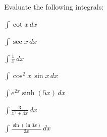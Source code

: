 \documentclass[12pt]{exam}
\begin{document}
\begin{questions}
Evaluate the following integrals:
\vspace{.1in}

\question $\displaystyle \int \cot x \, dx$
\vspace{.1in}

\question  $\displaystyle \int \sec x \, dx$
\vspace{.1in}

\question $\displaystyle \int \frac{1}{x}  \, dx$
\vspace{.1in}

\question $\displaystyle \int  \cos^2 x \, \sin x \, dx$
\vspace{.1in}

\question $\displaystyle \int e^{2x} \sinh(5x)\, dx$
\vspace{.1in}

\question $\displaystyle \int  \frac{3}{x^2+4x} \, dx$
\vspace{.1in}

\question $\displaystyle \int   \frac{\sin(\ln 3x)}{2x} \, dx$
\vspace{.1in}




\end{questions}
\end{document}
